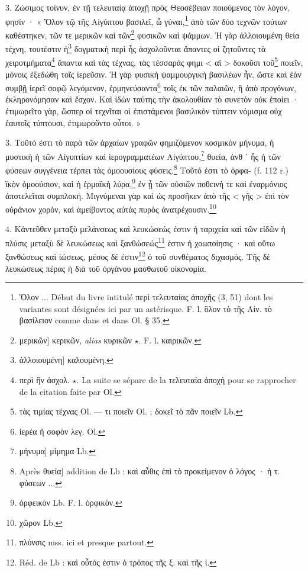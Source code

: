 \documentclass[a4paper, 11pt, oneside, polutonikogreek, french]{article}
\begin{document}
3. Ζώσιμος τοίνυν, ἐν τῇ τελευταίᾳ ἀποχῇ πρὸς Θεοσέβειαν ποιούμενος τὸν λόγον, φησίν · « Ὅλον τῷ τῆς Αἰγύπτου βασιλεῖ, ὦ γύναι,\footnote{Ὅλον ... Début du livre intitulé περὶ τελευταίας ἀποχῆς (3, 51) dont les variantes sont désignées ici par un astérisque. F. l. ὃλον τὸ τῆς Αἰν. τὸ βασίλειον comme dans et dans Ol. § 35.} ἀπὸ τῶν δύο τεχνῶν τούτων καθέστηκεν, τῶν τε μερικῶν καὶ τῶν\footnote{μερικῶν] κερικῶν, \emph{alias} κυρικῶν $\star$. F. l. καιρικῶν.} φυσικῶν καὶ ψάμμων. Ἡ γὰρ ἀλλοιουμένη θεία τέχνη, τουτέστιν ἡ\footnote{ἀλλοιουμένη] καλουμένη.} δογματικὴ περὶ ἧς ἀσχολοῦνται ἅπαντες οἱ ζητοῦντες τὰ χειροτμήματα\footnote{περὶ ἣν ἀσχολ. $\star$. La suite se sépare de la τελευταία ἀποχή pour se rapprocher de la citation faite par Ol.} ἅπαντα καὶ τὰς τέχνας, τὰς τέσσαράς φημι < αἳ > δοκοῦσι τοῦ\footnote{τὰς τιμίας τέχνας Ol. --- τι ποιεῖν Ol. ; δοκεῖ τὸ πᾶν ποιεῖν Lb.} ποιεῖν, μόνοις ἐξεδώθη τοῖς ἱερεῦσιν. Ἡ γὰρ φυσικὴ ψαμμουργικὴ βασιλέων ἦν, ὥστε καὶ ἐὰν συμβῇ ἱερεῖ σοφῷ λεγόμενον, ἑρμηνεύσαντα\footnote{ἱερέα ἢ σοφὸν λεγ. Ol.} τοῖς ἐκ τῶν παλαιῶν, ἢ ἀπὸ προγόνων, ἐκληρονόμησαν καὶ ἔσχον. Καὶ ἰδὼν ταύτης τὴν ἀκολουθίαν τὸ συνετὸν οὐκ ἐποίει · ἐτιμωρεῖτο γὰρ, ὥσπερ οἱ τεχνῖται οἱ ἐπιστάμενοι βασιλικὸν τύπτειν νόμισμα οὐχ ἑαυτοῖς τύπτουσι, ἐτιμωροῦντο οὗτοι. »

3. Τοῦτό ἐστι τὸ παρὰ τῶν ἀρχαίων γραφῶν φημιζόμενον κοσμικὸν μήνυμα, ἡ μυστικὴ ἡ τῶν Αἰγυπτίων καὶ ἱερογραμματέων Αἰγύπτου,\footnote{μήνυμα] μίμημα Lb.} θυεία, ἀνθ ᾽ ἧς ἡ τῶν φύσεων συγγένεια τέρπει τὰς ὁμοουσίους φύσεις.\footnote{Après θυεία] addition de Lb : καὶ αὖθις ἐπὶ τὸ προκείμενον ὁ λόγος · ἡ τ. φύσεων ...} Τοῦτό ἐστι τὸ ὀρφα- (f. 112 r.) ϊκὸν ὁμοούσιον, καὶ ἡ ἑρμαϊκὴ λύρα,\footnote{ὀρφεικὸν Lb. F. l. ὀρφικὸν.} ἐν ᾗ τῶν οὐσιῶν ποθεινή τε καὶ ἐναρμόνιος ἀποτελεῖται συμπλοκή. Μιγνύμεναι γὰρ καὶ ὡς προσῆκεν ἀπὸ τῆς < γῆς > ἐπὶ τὸν οὐράνιον χορὸν, καὶ ἀμείβοντος αὐτὰς πυρὸς ἀνατρέχουσιν.\footnote{χῶρον Lb.}

4. Κἀντεῦθεν μεταξὺ μελάνσεως καὶ λευκώσεώς ἐστιν ἡ ταριχεία καὶ τῶν εἰδῶν ἡ πλύσις μεταξὺ δὲ λευκώσεως καὶ ξανθώσεώς\footnote{πλύνσις mss. ici et presque partout.} ἐστιν ἡ χοωποίησις · καὶ οὕτω ξανθώσεως καὶ ἰώσεως, μέσος δέ ἐστιν\footnote{Réd. de Lb : καὶ οὗτός ἐστιν ὁ τρόπος τῆς ξ. καὶ τῆς ἰ.} ὀ τοῦ συνθέματος διχασμός. Τῆς δὲ λευκώσεως πέρας ἡ διὰ τοῦ ὀργάνου μασθωτοῦ οἰκονομία.
\end{document}
